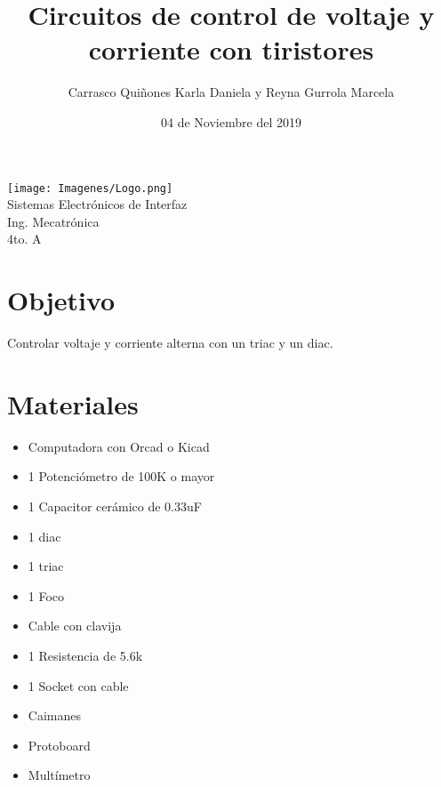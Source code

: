 \documentclass[letterpaper]{article}
\title{Circuitos de control de voltaje y corriente con tiristores}
\author{Carrasco Quiñones Karla Daniela y Reyna Gurrola Marcela}
\date{04 de Noviembre del 2019}
\begin{document}
\maketitle
\begin{center}
    \texttt{[image: Imagenes/Logo.png]}\\
    \vspace{1cm}
Sistemas Electrónicos de Interfaz\\
Ing. Mecatrónica\\
4to. A
\end{center}
\newpage

\section{Objetivo}
Controlar voltaje y corriente alterna con un triac y un diac.

\section{Materiales}
\begin{itemize}
    \item Computadora con Orcad o Kicad
    \item 1 Potenciómetro de 100K o mayor
    \item 1 Capacitor cerámico de 0.33uF
    \item 1 diac
    \item 1 triac 
    \item 1 Foco
    \item Cable con clavija
    \item 1 Resistencia de 5.6k
    \item 1 Socket con cable
    \item Caimanes
    \item Protoboard
    \item Multímetro
\end{itemize}
\end{document}
